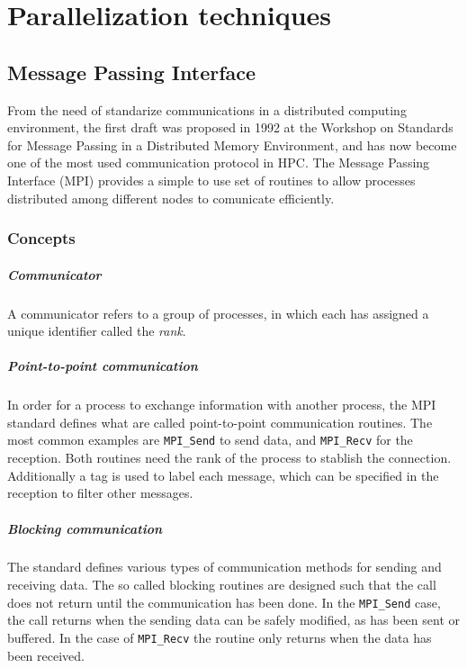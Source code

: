 \chapter{Parallelization techniques}
\label{ch:techniques}

\section{Message Passing Interface}

From the need of standarize communications in a distributed computing
environment, the first draft was proposed in 1992 at the Workshop on Standards
for Message Passing in a Distributed Memory Environment, and has now become one
of the most used communication protocol in HPC. The Message Passing Interface
(MPI) provides a simple to use set of routines to allow processes distributed
among different nodes to comunicate efficiently.

\subsection{Concepts}


\paragraph{Communicator} A communicator refers to a group of processes, in which
each has assigned a unique identifier called the \textit{rank}.

\paragraph{Point-to-point communication} In order for a process to exchange
information with another process, the MPI standard defines what are called
point-to-point communication routines. The most common examples are
\texttt{MPI\_Send} to send data, and \texttt{MPI\_Recv} for the reception.
Both routines need the rank of the process to stablish the connection.
Additionally a tag is used to label each message, which can be specified in the
reception to filter other messages.

\paragraph{Blocking communication} The standard defines various types of
communication methods for sending and receiving data. The so called blocking
routines are designed such that the call does not return until the communication
has been done. In the \texttt{MPI\_Send} case, the call returns when the sending
data can be safely modified, as has been sent or buffered. In the case of
\texttt{MPI\_Recv} the routine only returns when the data has been received.

